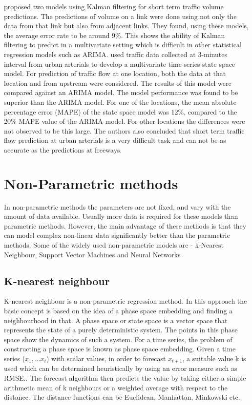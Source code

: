 \citet{okutani1984dynamic} proposed two models using Kalman filtering for short term traffic volume
predictions. The predictions of volume on a link were done using not only the data from that link but
also from adjacent links. They found, using these models, the average error rate to be around 9\%.
This shows the ability of Kalman filtering to predict in a multivariate setting which is difficult in
other statistical regression models such as ARIMA. \citet{stathopoulos2003multivariate} used traffic
data collected at 3-minutes interval from urban arterials to develop a multivariate time-series
state space model. For prediction of traffic flow at one location, both the data at that location
and from upstream were considered. The results of this model were compared against an ARIMA model.
The model performance was found to be superior than the ARIMA model. For one of the locations, the
mean absolute percentage error (MAPE) of the state space model was 12\%, compared to the 20\% MAPE value
of the ARIMA model. For other locations the differences were not observed to be this large. The
authors also concluded that short term traffic flow prediction at urban arterials is a very difficult
task and can not be as accurate as the predictions at freeways.

\section{Non-Parametric methods}
In non-parametric methods the parameters are not fixed, and vary with the amount of data available.
Usually more data is required for these models than parametric methods. However, the main advantage
of these methods is that they can model complex non-linear data significantly better than the
parametric methods. Some of the widely used non-parametric models are - k-Nearest Neighbour,
Support Vector Machines and Neural Networks

\subsection{K-nearest neighbour}
K-nearest neighbour is a non-parametric regression method. In this approach the basic concept is based
on the idea of a phase space embedding and finding a neighbourhood in that. A phase space or state
space is a vector space that represents the state of a purely deterministic system. The points in this
phase space show the dynamics of such a system. For a time series, the problem of constructing a phase
space is known as phase space embedding. Given a time series ($x_{1},...x_{t}$) with scalar values,
in order to forecast $x_{t+1}$, a suitable value k is used which can be determined heuristically by
using an error measure such as RMSE.. The forecast algorithm then predicts the value by taking either
a simple arithmetic mean of k neighbours or a weighted average with respect to the distance. The
distance functions can be Euclidean, Manhattan, Minkowski etc.

